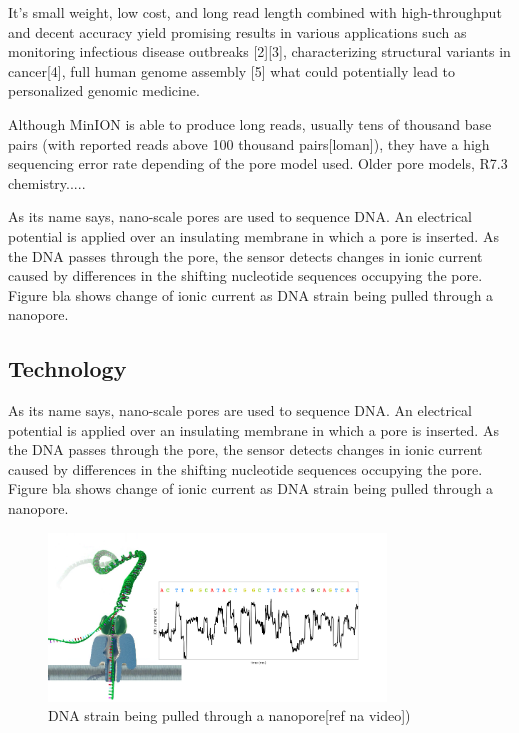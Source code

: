 \documentclass[times, utf8, diplomski, numeric, english]{fer}
\begin{document}
It’s small weight, low cost, and long read length combined with high-throughput and decent accuracy yield promising results in various applications such as monitoring infectious disease outbreaks [2][3], characterizing structural variants in cancer[4], full human genome assembly [5] what could potentially lead to personalized genomic medicine.

Although MinION is able to produce long reads, usually tens of thousand
base pairs (with reported reads above 100 thousand pairs[loman]), they have a high sequencing error
rate depending of the pore model used. Older pore models, R7.3 chemistry.....%



As its name says, nano-scale pores are used to sequence DNA. An electrical potential is applied over an insulating membrane in which a  pore is inserted. As the DNA passes through the pore, the sensor detects changes in ionic current caused by differences in the shifting nucleotide sequences occupying the pore. Figure bla shows change of ionic current as DNA strain being pulled through a nanopore.

\subsection{Technology}
As its name says, nano-scale pores are used to sequence DNA. An electrical potential is applied over an insulating membrane in which a  pore is inserted. As the DNA passes through the pore, the sensor detects changes in ionic current caused by differences in the shifting nucleotide sequences occupying the pore. Figure bla shows change of ionic current as DNA strain being pulled through a nanopore.

\begin{figure}[!ht]
	\begin{center}
		\includegraphics[width=0.8\textwidth]{./imgs/nanopore.png}
		\caption{DNA strain being pulled through a nanopore[ref na video])}
		\label{fg:nanopore}
	\end{center}
\end{figure}
\end{document}
